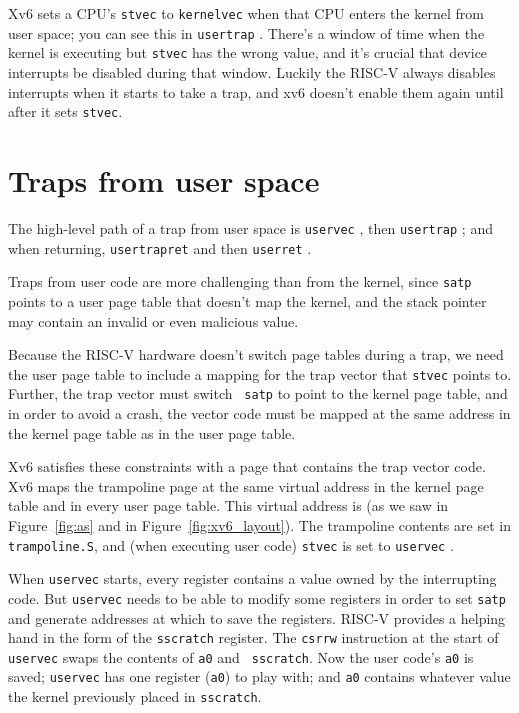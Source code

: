Xv6 sets a CPU's {\tt stvec} to {\tt kernelvec} when that CPU
enters the kernel from user space; you can see this in {\tt usertrap}
.
There's a window of time when the kernel is executing
but {\tt stvec} has the wrong value, and it's crucial that device
interrupts be disabled during that window.
Luckily the RISC-V always disables interrupts when it starts
to take a trap, and xv6 doesn't enable them again until
after it sets {\tt stvec}.

\section{Traps from user space}

The high-level path of a trap from user space is
{\tt uservec}
,
then {\tt usertrap}
;
and when returning,
{\tt usertrapret}
and then
{\tt userret}
.

Traps from user code are more challenging than from the kernel, since
{\tt satp} points to a user page table that doesn't map the 
kernel, and the stack pointer may contain an invalid or even malicious
value.

Because the RISC-V hardware doesn't switch page tables during a trap,
we need the user page table to include a mapping for the trap vector
that {\tt stvec} points to. Further, the trap vector must switch {\tt
  satp} to point to the kernel page table, and in order to avoid a
crash, the vector code must be mapped at the same address in the
kernel page table as in the user page table.

Xv6 satisfies these constraints with a  page
that contains the trap vector code. Xv6 maps the trampoline page at
the same virtual address in the kernel page table and in every user
page table. This virtual address is  (as we saw
in Figure~\ref{fig:as} and in Figure~\ref{fig:xv6_layout}). The
trampoline contents are set in {\tt trampoline.S},
and (when executing user code) {\tt stvec} is set to
{\tt uservec}
.

When {\tt uservec} starts, every register contains a value owned by
the interrupting code. But {\tt uservec} needs to be able to modify
some registers in order to set {\tt satp} and generate addresses at
which to save the registers. RISC-V provides a helping hand in the
form of the {\tt sscratch} register. The {\tt csrrw} instruction at
the start of {\tt uservec} swaps the contents of {\tt a0} and {\tt
  sscratch}. Now the user code's {\tt a0} is saved; {\tt uservec} has
one register ({\tt a0}) to play with; and {\tt a0} contains whatever
value the kernel previously placed in {\tt sscratch}.

